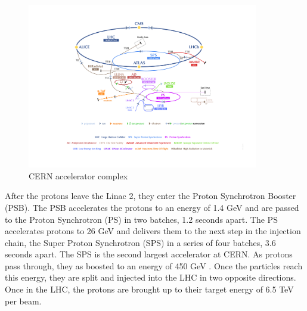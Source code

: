 \begin{figure}[h]
\begin{center}
\includegraphics*[width=0.90\textwidth] {figures/CERN_Accelerator_Complex}%
\caption[CERN accelerator complex]{CERN accelerator complex \cite{DeMelis:2119882}}
\label{fig:CERN_ACC}
\end{center}
\end{figure}


\indent After the protons leave the Linac 2, they enter the Proton Synchrotron Booster (PSB)\cite{Reich}. The PSB accelerates the protons to an energy of 1.4 GeV and are passed to the Proton Synchrotron (PS) in two batches, 1.2 seconds apart. The PS accelerates protons to 26 GeV and delivers them to the next step in the injection chain, the Super Proton Synchrotron (SPS) in a series of four batches, 3.6 seconds apart. The SPS is the second largest accelerator at CERN. As protons pass through, they as boosted to an energy of 450 GeV \cite{Brianti:340514}. Once the particles reach this energy, they are split and injected into the LHC in two opposite directions. Once in the LHC, the protons are brought up to their target energy of 6.5 TeV per beam.
